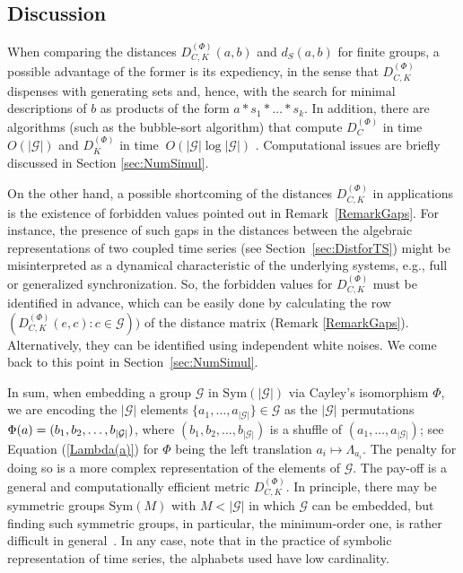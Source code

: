\documentclass{article}
\begin{document}
\subsection{Discussion}

\label{sec:Discussion}

When comparing the distances $D_{C,K}^{(\Phi )}(a,b)$ and $d_{S}(a,b)$ for
finite groups, a possible advantage of the former is its expediency, in the
sense that $D_{C,K}^{(\Phi )}$ dispenses with generating sets and, hence,
with the search for minimal descriptions of $b$ as products of the form $%
a\ast s_{1}\ast \ldots\ast s_{k}$. In addition, there are algorithms (such as
the bubble-sort algorithm) that compute $D_{C}^{(\Phi )}$ in time $%
O(\left\vert \mathcal{G}\right\vert )$ and $D_{K}^{(\Phi )}$ in time $\
O(\left\vert \mathcal{G}\right\vert \log \left\vert \mathcal{G}\right\vert )$
\cite{Cicirello2019}. Computational issues are briefly discussed in Section %
\ref{sec:NumSimul}.

On the other hand, a possible shortcoming of the distances $D_{C,K}^{(\Phi
)} $ in applications is the existence of forbidden values pointed out in
Remark~\ref{RemarkGaps}. For instance, the presence of such gaps in the
distances between the algebraic representations of two coupled time series
(see Section~\ref{sec:DistforTS}) might be misinterpreted as a dynamical
characteristic of the underlying systems, e.g., full or generalized
synchronization. So, the forbidden values for $D_{C,K}^{(\Phi )}$ must be
identified in advance, which can be easily done by calculating the row $%
(D_{C,K}^{(\Phi )}(e,c):c\in \mathcal{G}))$ of the distance matrix (Remark %
\ref{RemarkGaps}). Alternatively, they can be identified using independent
white noises. We come back to this point in Section~\ref{sec:NumSimul}.

In sum, when embedding a group $\mathcal{G}$ in $\mathrm{Sym}(\left\vert 
\mathcal{G}\right\vert )$ via Cayley's isomorphism $\Phi $, we are encoding
the $\left\vert \mathcal{G}\right\vert $ elements $\{a_{1},\ldots,a_{\left\vert 
\mathcal{G}\right\vert }\}\in \mathcal{G}$ as the $\left\vert \mathcal{G}%
\right\vert $ permutations $\Phi (a)=(b_{1},b_{2},\ldots,b_{\left\vert \mathcal{%
G}\right\vert })$, where $(b_{1},b_{2},\ldots,b_{\left\vert \mathcal{G}%
\right\vert })$ is a shuffle of $(a_{1},\ldots,a_{\left\vert \mathcal{G}%
\right\vert })$; see Equation (\ref{Lambda(a)}) for $\Phi $ being the left
translation $a_{i}\mapsto \Lambda _{a_{i}}$. The penalty for doing so is a
more complex representation of the elements of $\mathcal{G}$. The pay-off is a general and
computationally efficient metric $D_{C,K}^{(\Phi )}$. In principle, there
may be symmetric groups $\mathrm{Sym}(M)$ with $M<\left\vert \mathcal{G}%
\right\vert $ in which $\mathcal{G}$ can be embedded, but finding such symmetric groups, in particular, the minimum-order one, is rather difficult in general~\cite{Johnson1971,Grechkoseeva2003}. In any case, note that in the practice of symbolic representation of time series, the alphabets used have low cardinality.
\end{document}
